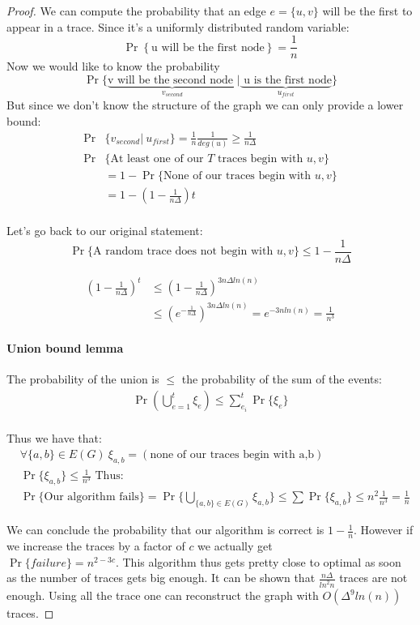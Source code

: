 \documentclass[]{article}
\begin{document}
\begin{proof}
	We can compute the probability that an edge $e = \{u, v\}$ will be the first to appear in a trace. Since it's a uniformly distributed random variable: \[\Pr\left\{\text{u will be the first node}\right\} = \frac{1}{n}\] Now we would like to know the probability 
	\[\Pr\{\underbrace{\text{v will be the second node }}_{v_{second}} | \underbrace{\text{ u is the first node} }_{u_{first}}\}\] 
	But since we don't know the structure of the graph we can only provide a lower bound:
	\begin{align*}
		\Pr&\{v_{second} |\ u_{first} \} = \frac{1}{n} \frac{1}{deg(u)} \geq \frac{1}{n\Delta}\\
		\Pr&\{\text{At least one of our } T \text{ traces begin with }u, v\}\\
		&= 1 - \Pr\{\text{None of our traces begin with }u, v\}\\
		&= 1- \left(1-\frac{1}{n\Delta}\right)t\\
	\end{align*}
	
	
Let's go back to our original statement:
\[	\Pr\{\text{A random trace does not begin with }u, v\} \leq 1 -\frac{1}{n\Delta}	\]
	
	\begingroup
	\addtolength{\jot}{1em}
	\begin{align*}
		\left(1 -\frac{1}{n\Delta}\right)^t &\leq \left(1 -\frac{1}{n\Delta}\right)^{3n\Delta ln(n)}\\
		&\leq \left(e^{-\frac{1}{n\Delta}}\right)^{3n\Delta ln(n)} = e^{-3nln(n)} = \frac{1}{n^3}
	\end{align*}
	\endgroup
	
\paragraph{Union bound lemma}
The probability of the union is $\leq$ the probability of the sum of the events:
\begin{align*}
\Pr\left(\bigcup_{e=1}^{t} \xi_e\right) \leq \sum_{e_i}^{t}\Pr\{\xi_e\}\\
\end{align*}	

Thus we have that:
\begin{align*}
	&\forall \{a,b\} \in E(G)\ \xi_{a,b} = (\text{none of our traces begin with a,b})\\
	&\Pr\{\xi_{a,b}\} \leq \frac{1}{n^3} \text{ Thus:}\\
	&\Pr\{\text{Our algorithm fails}\} =\Pr\{\bigcup_{\{a,b\}\in E(G)}^{} \xi_{a,b}\}\leq \sum\Pr\{\xi_{a,b}\} \leq n^2 \frac{1}{n^3} = \frac{1}{n}
\end{align*}

We can conclude the probability that our algorithm is correct is $1-\frac{1}{n}$. However if we increase the traces by a factor of $c$ we actually get\\ $\Pr\{failure\} = n^{2-3c}$. This algorithm thus gets pretty close to optimal as soon as the number of traces gets big enough. It can be shown that $\frac{n\Delta}{{ln}^2n}$ traces are not enough. Using all the trace one can reconstruct the graph with $O(\Delta^9ln(n))$ traces.
\end{proof}
\end{document}
